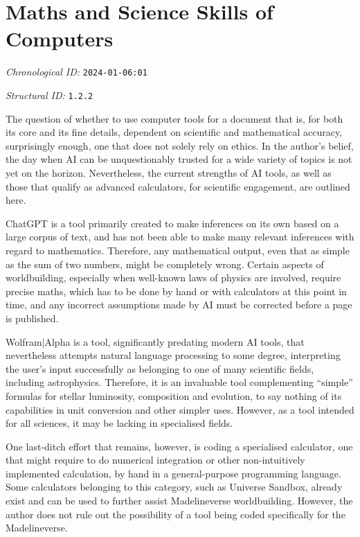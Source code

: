 \section{Maths and Science Skills of Computers}
\emph{Chronological ID:} \texttt{2024-01-06:01}

\emph{Structural ID:} \texttt{1.2.2}

The question of whether to use computer tools for a document that is, for both its core and its fine details, dependent on scientific and mathematical accuracy, surprisingly enough, one that does not solely rely on ethics. In the author's belief, the day when AI can be unquestionably trusted for a wide variety of topics is not yet on the horizon. Nevertheless, the current strengths of AI tools, as well as those that qualify as advanced calculators, for scientific engagement, are outlined here.

ChatGPT is a tool primarily created to make inferences on its own based on a large corpus of text, and has not been able to make many relevant inferences with regard to mathematics. Therefore, any mathematical output, even that as simple as the sum of two numbers, might be completely wrong. Certain aspects of worldbuilding, especially when well-known laws of physics are involved, require precise maths, which has to be done by hand or with calculators at this point in time, and any incorrect assumptions made by AI must be corrected before a page is published.

Wolfram$\vert$Alpha is a tool, significantly predating modern AI tools, that nevertheless attempts natural language processing to some degree, interpreting the user's input successfully as belonging to one of many scientific fields, including astrophysics. Therefore, it is an invaluable tool complementing ``simple'' formulas for stellar luminosity, composition and evolution, to say nothing of its capabilities in unit conversion and other simpler uses. However, as a tool intended for all sciences, it may be lacking in specialised fields.

One last-ditch effort that remains, however, is coding a specialised calculator, one that might require to do numerical integration or other non-intuitively implemented calculation, by hand in a general-purpose programming language. Some calculators belonging to this category, such as Universe Sandbox, already exist and can be used to further assist Madelineverse worldbuilding. However, the author does not rule out the possibility of a tool being coded specifically for the Madelineverse.
\newpage
